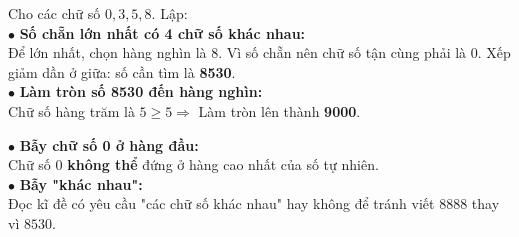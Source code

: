 \documentclass[14pt,a4paper,oneside]{extbook}
\begin{document}
\noindent
\begin{minipage}[t]{0.53\textwidth}
  \begin{tcolorbox}[
    enhanced,
    title={\footnotesize\bfseries\color{white}\faCheckCircle\ Ví dụ thực hành chuẩn mực},
    colback=green!2!white,
    colframe=green!60!black,
    arc=2.5mm, boxrule=0.8pt, top=1.8mm, bottom=1.8mm, left=2.2mm, right=2.2mm
  ]
    \footnotesize
    Cho các chữ số $0, 3, 5, 8$. Lập:\\
    $\bullet$ \textbf{Số chẵn lớn nhất có 4 chữ số khác nhau:}\\
    Để lớn nhất, chọn hàng nghìn là $8$. Vì số chẵn nên chữ số tận cùng phải là $0$. Xếp giảm dần ở giữa: số cần tìm là \textbf{8530}.\\
    $\bullet$ \textbf{Làm tròn số 8530 đến hàng nghìn:}\\
    Chữ số hàng trăm là $5 \ge 5 \Rightarrow$ Làm tròn lên thành \textbf{9000}.
  \end{tcolorbox}
\end{minipage}%
\hfill
\begin{minipage}[t]{0.45\textwidth}
  \begin{tcolorbox}[
    enhanced,
    title={\footnotesize\bfseries\color{white}\faExclamationTriangle\ Mẹo tránh bẫy trắc nghiệm},
    colback=red!2!white,
    colframe=red!70!black,
    arc=2.5mm, boxrule=0.8pt, top=1.8mm, bottom=1.8mm, left=2.2mm, right=2.2mm
  ]
    \footnotesize
    $\bullet$ \textbf{Bẫy chữ số 0 ở hàng đầu:}\\
    Chữ số $0$ \textbf{không thể} đứng ở hàng cao nhất của số tự nhiên.\\
    $\bullet$ \textbf{Bẫy "khác nhau":}\\
    Đọc kĩ đề có yêu cầu "các chữ số khác nhau" hay không để tránh viết $8888$ thay vì $8530$.
  \end{tcolorbox}
\end{minipage}
\end{document}
